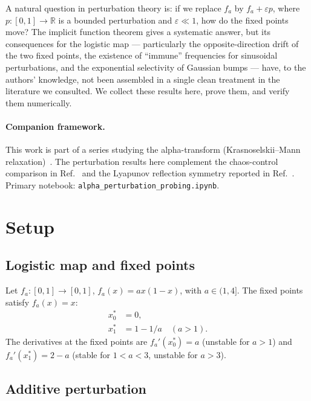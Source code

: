 \documentclass[aps,pre,twocolumn,superscriptaddress,nofootinbib,
               longbibliography,floatfix]{revtex4-2}
\newcommand{\eps}{\varepsilon}
\newcommand{\xsz}{x^*_0}
\newcommand{\xso}{x^*_1}
\theoremstyle{plain}
\theoremstyle{remark}
\begin{document}
A natural question in perturbation theory is:
if we replace $f_a$ by $f_a + \eps p$, where $p: [0,1]\to\mathbb{R}$
is a bounded perturbation and $\eps \ll 1$, how do the fixed
points move?
The implicit function theorem gives a systematic answer, but
its consequences for the logistic map — particularly the
opposite-direction drift of the two fixed points, the existence
of ``immune'' frequencies for sinusoidal perturbations, and the
exponential selectivity of Gaussian bumps — have, to the authors'
knowledge, not been assembled in a single clean treatment
in the literature we consulted.
We collect these results here, prove them, and verify them
numerically.

\paragraph{Companion framework.}
This work is part of a series studying the alpha-transform
(Krasnoselskii--Mann relaxation)~\cite{DysonPaper,PetrificationRepo}.
The perturbation results here complement the chaos-control
comparison in Ref.~\cite{ChaosPaper} and the Lyapunov
reflection symmetry reported in Ref.~\cite{Z2Paper}.
Primary notebook: \texttt{alpha\_perturbation\_probing.ipynb}.

\section{Setup}
\label{sec:setup}

\subsection{Logistic map and fixed points}

Let $f_a : [0,1]\to[0,1]$, $f_a(x) = ax(1-x)$, with
$a \in (1,4]$.
The fixed points satisfy $f_a(x) = x$:
%
\begin{align}
  \xsz &= 0, \\
  \xso &= 1 - 1/a \quad (a > 1).
\end{align}
%
The derivatives at the fixed points are
$f_a'(\xsz) = a$ (unstable for $a > 1$) and
$f_a'(\xso) = 2 - a$ (stable for $1 < a < 3$, unstable for $a > 3$).

\subsection{Additive perturbation}
\end{document}

